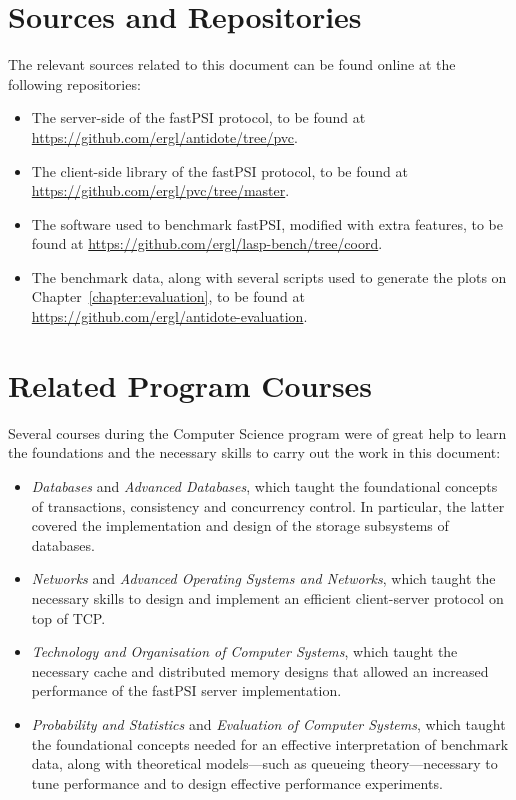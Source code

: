 \section{Sources and Repositories}

The relevant sources related to this document can be found online at the following repositories:

\begin{itemize}
    \item The server-side of the fastPSI protocol, to be found at \url{https://github.com/ergl/antidote/tree/pvc}.

    \item The client-side library of the fastPSI protocol, to be found at \url{https://github.com/ergl/pvc/tree/master}.

    \item The software used to benchmark fastPSI, modified with extra features, to be found at \url{https://github.com/ergl/lasp-bench/tree/coord}.

    \item The benchmark data, along with several scripts used to generate the plots on Chapter~\ref{chapter:evaluation}, to be found at \url{https://github.com/ergl/antidote-evaluation}.
\end{itemize}

\section{Related Program Courses}

Several courses during the Computer Science program were of great help to learn the foundations and the necessary skills to carry out the work in this document:

\begin{itemize}
    \item \emph{Databases} and \emph{Advanced Databases}, which taught the foundational concepts of transactions, consistency and concurrency control. In particular, the latter covered the implementation and design of the storage subsystems of databases.

    \item \emph{Networks} and \emph{Advanced Operating Systems and Networks}, which taught the necessary skills to design and implement an efficient client-server protocol on top of TCP.

    \item \emph{Technology and Organisation of Computer Systems}, which taught the necessary cache and distributed memory designs that allowed an increased performance of the fastPSI server implementation.

    \item \emph{Probability and Statistics} and \emph{Evaluation of Computer Systems}, which taught the foundational concepts needed for an effective interpretation of benchmark data, along with theoretical models---such as queueing theory---necessary to tune performance and to design effective performance experiments.
\end{itemize}
